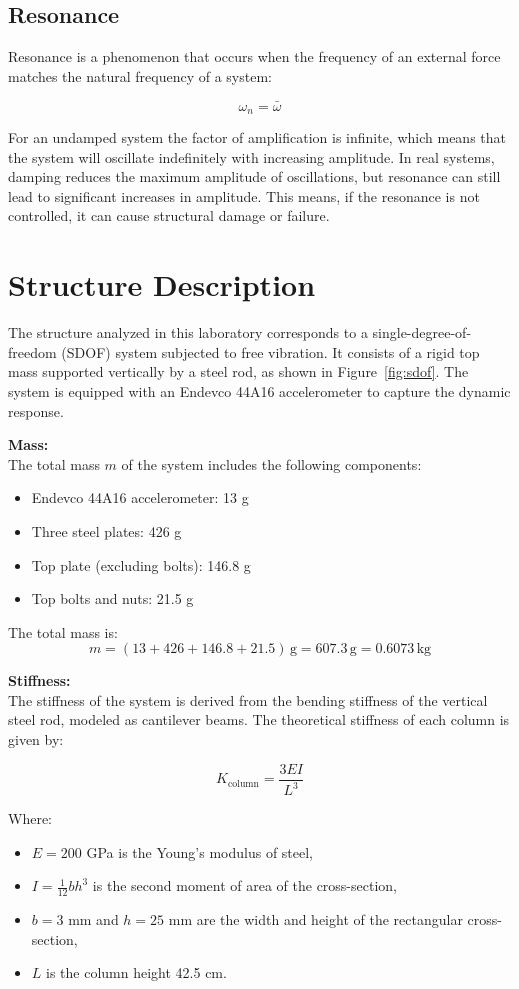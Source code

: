 \documentclass{article}  %
\begin{document}
\subsection{Resonance}
Resonance is a phenomenon that occurs when the frequency of an external force matches the natural frequency of a system:

$$\omega_n = \bar{\omega}$$

For an undamped system the factor of amplification is infinite, which means that the system will oscillate indefinitely with increasing amplitude. In real systems, damping reduces the maximum amplitude of oscillations, but resonance can still lead to significant increases in amplitude. This means, if the resonance is not controlled, it can cause structural damage or failure. 
\newpage
\section{Structure Description}

The structure analyzed in this laboratory corresponds to a single-degree-of-freedom (SDOF) system subjected to free vibration. It consists of a rigid top mass supported vertically by a steel rod, as shown in Figure~\ref{fig:sdof}. The system is equipped with an Endevco 44A16 accelerometer to capture the dynamic response.

\textbf{Mass:} \\
The total mass $m$ of the system includes the following components:

\begin{itemize}
    \item Endevco 44A16 accelerometer: 13 g
    \item Three steel plates: 426 g
    \item Top plate (excluding bolts): 146.8 g
    \item Top bolts and nuts: 21.5 g
\end{itemize}

The total mass is:
\[
m = (13 + 426 + 146.8 + 21.5)\,\text{g} = 607.3\,\text{g} = 0.6073\,\text{kg}
\]

\textbf{Stiffness:} \\
The stiffness of the system is derived from the bending stiffness of the vertical steel rod, modeled as cantilever beams. The theoretical stiffness of each column is given by:

\[
K_{\text{column}} = \frac{3EI}{L^3}
\]

Where:
\begin{itemize}
    \item $E = 200$ GPa is the Young's modulus of steel,
    \item $I = \frac{1}{12} b h^3$ is the second moment of area of the cross-section,
    \item $b = 3$ mm and $h = 25$ mm are the width and height of the rectangular cross-section,
    \item $L$ is the column height 42.5 cm.
\end{itemize}
\end{document}
